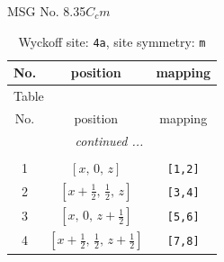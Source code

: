 \documentclass[fleqn,8pt]{jsarticle}
\begin{document}
\setcounter{MaxMatrixCols}{32}

\renewcommand{\tablename}{Table~}
\renewcommand{\figurename}{Figure~}
\begin{center}
\LARGE
MSG No. 8.35\quad$C_{c}m$
\end{center}
\renewcommand{\arraystretch}{1.2}
\begin{longtable}{ccc}
\caption{Wyckoff site: {\tt 4a}, site symmetry: {\tt m}}
 \\
 \hline \hline
No. & position & mapping \\ \hline \endfirsthead

\multicolumn{2}{l}{\tablename\ \thetable{}} \\
 \hline \hline
No. & position & mapping \\ \hline \endhead

 \hline \hline
\multicolumn{2}{r}{\footnotesize\it continued ...} \\ \endfoot

 \hline \hline
\multicolumn{2}{r}{} \\ \endlastfoot

1 & $\left[ x,\, 0,\, z \right]$ & {\tt [1,2]} \\ \hline
2 & $\left[ x + \frac{1}{2},\, \frac{1}{2},\, z \right]$ & {\tt [3,4]} \\ \hline
3 & $\left[ x,\, 0,\, z + \frac{1}{2} \right]$ & {\tt [5,6]} \\ \hline
4 & $\left[ x + \frac{1}{2},\, \frac{1}{2},\, z + \frac{1}{2} \right]$ & {\tt [7,8]} \\
\end{longtable}
\renewcommand{\arraystretch}{1.2}
\end{document}
